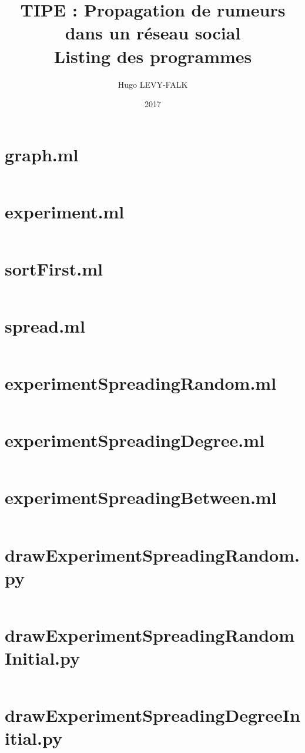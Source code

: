 \documentclass{article}
\title{TIPE : Propagation de rumeurs dans un réseau social\\Listing des programmes}
\author{Hugo LEVY-FALK}
\date{2017}
\newcommand\programme[2]{\section{#1}\inputminted{#2}{../../generationDeGraph/#1}}
\begin{document}
\maketitle
{}\;
\tableofcontents
\newpage

\programme{graph.ml}{ocaml}
\programme{experiment.ml}{ocaml}
\programme{sortFirst.ml}{ocaml}
\programme{spread.ml}{ocaml}
\programme{experimentSpreadingRandom.ml}{ocaml}
\programme{experimentSpreadingDegree.ml}{ocaml}
\programme{experimentSpreadingBetween.ml}{ocaml}
\programme{drawExperimentSpreadingRandom.py}{python}
\programme{drawExperimentSpreadingRandomInitial.py}{python}
\programme{drawExperimentSpreadingDegreeInitial.py}{python}
\end{document}
